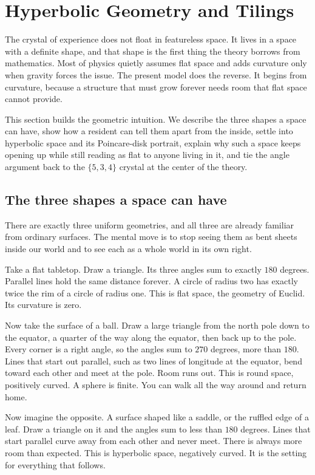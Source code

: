 \section{Hyperbolic Geometry and Tilings}

The crystal of experience does not float in featureless space. It lives in a space with a definite shape,
and that shape is the first thing the theory borrows from mathematics. Most of physics quietly assumes flat
space and adds curvature only when gravity forces the issue. The present model does the reverse. It begins
from curvature, because a structure that must grow forever needs room that flat space cannot provide.

This section builds the geometric intuition. We describe the three shapes a space can have, show how a
resident can tell them apart from the inside, settle into hyperbolic space and its Poincare-disk portrait,
explain why such a space keeps opening up while still reading as flat to anyone living in it, and tie the
angle argument back to the $\{5,3,4\}$ crystal at the center of the theory.

\subsection{The three shapes a space can have}

There are exactly three uniform geometries, and all three are already familiar from ordinary surfaces. The
mental move is to stop seeing them as bent sheets inside our world and to see each as a whole world in its
own right.

Take a flat tabletop. Draw a triangle. Its three angles sum to exactly $180$ degrees. Parallel lines hold
the same distance forever. A circle of radius two has exactly twice the rim of a circle of radius one. This
is flat space, the geometry of Euclid. Its curvature is zero.

Now take the surface of a ball. Draw a large triangle from the north pole down to the equator, a quarter of
the way along the equator, then back up to the pole. Every corner is a right angle, so the angles sum to
$270$ degrees, more than $180$. Lines that start out parallel, such as two lines of longitude at the
equator, bend toward each other and meet at the pole. Room runs out. This is round space, positively
curved. A sphere is finite. You can walk all the way around and return home.

Now imagine the opposite. A surface shaped like a saddle, or the ruffled edge of a leaf. Draw a triangle on
it and the angles sum to less than $180$ degrees. Lines that start parallel curve away from each other and
never meet. There is always more room than expected. This is hyperbolic space, negatively curved. It is the
setting for everything that follows.

